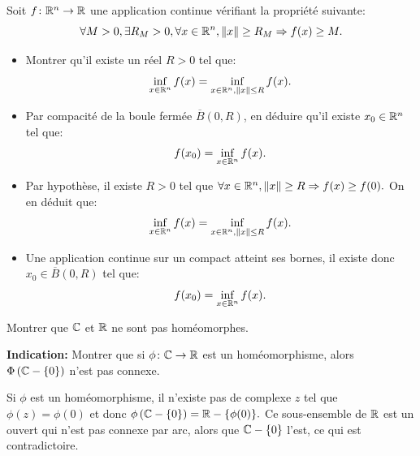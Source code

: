 \documentclass[a4paper, 12pt]{amsart}
\begin{document}

\begin{fex}
    Soit $f \colon \mathbb{R}^n \to \mathbb{R}$ une application continue vérifiant la propriété suivante:
    \[
    \forall M > 0, \exists R_M > 0, \forall x \in \mathbb{R}^n, \| x \| \geq R_M \Rightarrow f(x) \geq M. 
    \]
    \begin{itemize}
        \item Montrer qu'il existe un réel $R > 0$ tel que:
        \[\inf_{x\in \mathbb{R}^n} f(x) = \inf_{x\in \mathbb{R}^n, \|x\| \leq R} f(x).\]
        \item Par compacité de la boule fermée $\overline{B}(0,R)$, en déduire qu'il existe $x_0 \in \mathbb{R}^n$ tel que:
        \[
        f(x_0) = \inf_{x\in \mathbb{R}^n} f(x).
        \]
    \end{itemize}
\end{fex}
\begin{itemize}
    \item  Par hypothèse, il existe $R> 0$ tel que $\forall x \in \mathbb{R}^n, \| x \| \geq R \Rightarrow f(x) \geq f(0).$ On en déduit que:
    \begin{equation}
        \inf_{x\in \mathbb{R}^n} f(x) = \inf_{x\in \mathbb{R}^n, \|x\| \leq R} f(x).
    \end{equation}
    \item Une application continue sur un compact atteint ses bornes, il existe donc $x_0 \in \overline{B}(0,R)$ tel que:
    \begin{equation}
        f(x_0) = \inf_{x\in \mathbb{R}^n} f(x).
    \end{equation}
\end{itemize}


\begin{fex}
   Montrer que $\mathbb{C}$ et $\mathbb{R}$ ne sont pas homéomorphes. 
    
    \textbf{Indication:} Montrer que si $\phi \colon \mathbb{C} \to \mathbb{R}$ est un homéomorphisme, alors $\Phi\left(\mathbb{C}-\{0\}\right)$ n'est pas connexe.    
\end{fex}
Si $\phi$ est un homéomorphisme, il n'existe pas de complexe $z$ tel que $\phi(z)=\phi(0)$ et donc
$\phi\left(\mathbb{C} - \{0\}\right)=\mathbb{R}-\{\phi(0)\}.$ Ce sous-ensemble de $\mathbb{R}$ est un ouvert qui n'est pas
connexe par arc, alors que $\mathbb{C} - \{0\}$ l'est, ce qui est contradictoire.

\end{document}
